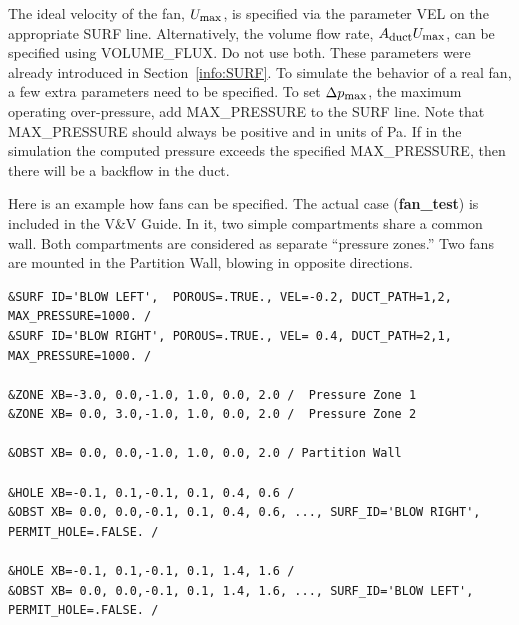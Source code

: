 \documentclass[11pt]{book}
\begin{document}
The ideal velocity of the fan, $U_{\hbox{\footnotesize max}}$, is specified via the parameter {\ct VEL} on the appropriate {\ct SURF} line. Alternatively,
the volume flow rate, $A_{\hbox{\footnotesize duct}} U_{\hbox{\footnotesize max}}$, can be specified using {\ct VOLUME\_FLUX}. Do not use both.  These parameters were
already introduced in Section~\ref{info:SURF}. To simulate the behavior of a real fan, a few extra parameters need to be specified. To set $\Delta p_{\hbox{\footnotesize max}}$,
the maximum operating over-pressure, add {\ct MAX\_PRESSURE} to the {\ct SURF} line. Note that {\ct MAX\_PRESSURE} should always be positive and in units of Pa.
If in the simulation the computed pressure exceeds the specified {\ct MAX\_PRESSURE}, then there will be a backflow in the duct.

Here is an example how fans can be specified. The actual case ({\bf fan\_test}) is included in the V\&V Guide. In it, two simple compartments share a common wall. Both
compartments are considered as separate ``pressure zones.'' Two fans are mounted in the Partition Wall, blowing in opposite directions.

\footnotesize
\begin{verbatim}
&SURF ID='BLOW LEFT',  POROUS=.TRUE., VEL=-0.2, DUCT_PATH=1,2, MAX_PRESSURE=1000. /
&SURF ID='BLOW RIGHT', POROUS=.TRUE., VEL= 0.4, DUCT_PATH=2,1, MAX_PRESSURE=1000. /

&ZONE XB=-3.0, 0.0,-1.0, 1.0, 0.0, 2.0 /  Pressure Zone 1
&ZONE XB= 0.0, 3.0,-1.0, 1.0, 0.0, 2.0 /  Pressure Zone 2

&OBST XB= 0.0, 0.0,-1.0, 1.0, 0.0, 2.0 / Partition Wall

&HOLE XB=-0.1, 0.1,-0.1, 0.1, 0.4, 0.6 /
&OBST XB= 0.0, 0.0,-0.1, 0.1, 0.4, 0.6, ..., SURF_ID='BLOW RIGHT', PERMIT_HOLE=.FALSE. /

&HOLE XB=-0.1, 0.1,-0.1, 0.1, 1.4, 1.6 /
&OBST XB= 0.0, 0.0,-0.1, 0.1, 1.4, 1.6, ..., SURF_ID='BLOW LEFT', PERMIT_HOLE=.FALSE. /
\end{verbatim}
\normalsize
\end{document}
